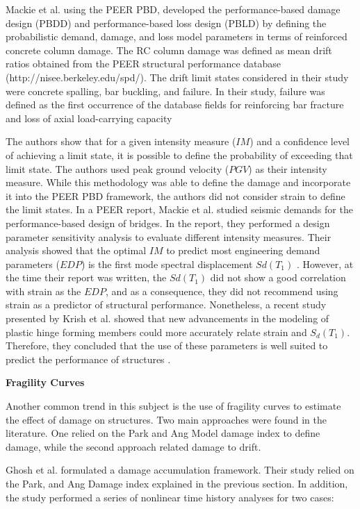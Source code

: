 Mackie et al. \cite{Mackie2007} using the PEER PBD, developed the performance-based damage design (PBDD) and performance-based loss design (PBLD) by defining the probabilistic demand, damage, and loss model parameters in terms of reinforced concrete column damage. The RC column damage was defined as mean drift ratios obtained from the PEER structural performance database (http://nisee.berkeley.edu/spd/). The drift limit states considered in their study were concrete spalling, bar buckling, and failure. In their study, failure was defined as the first occurrence of the database fields for reinforcing bar fracture and loss of axial load-carrying capacity 

The authors show that for a given intensity measure ($IM$) and a confidence level of achieving a limit state, it is possible to define the probability of exceeding that limit state. The authors used peak ground velocity ($PGV$) as their intensity measure. While this methodology was able to define the damage and incorporate it into the PEER PBD framework, the authors did not consider strain to define the limit states. In a PEER report, Mackie et al. studied seismic demands for the performance-based design of bridges. In the report, they performed a design parameter sensitivity analysis to evaluate different intensity measures. Their analysis showed that the optimal $IM$ to predict most engineering demand parameters ($EDP$) is the first mode spectral displacement $Sd(T_{1})$  \cite{Mackie2003}. However, at the time their report was written, the $Sd(T_{1})$ did not show a good correlation with strain as the $EDP$, and as a consequence, they did not recommend using strain as a predictor of structural performance. Nonetheless, a recent study presented by Krish et al. showed that new advancements in the modeling of plastic hinge forming members could more accurately relate strain and $S_{d}(T_{1})$. Therefore, they concluded that the use of these parameters is well suited to predict the performance of structures \cite{Krish2018}.

\textbf{Fragility Curves}

Another common trend in this subject is the use of fragility curves to estimate the effect of damage on structures. Two main approaches were found in the literature. One relied on the Park and Ang Model damage index to define damage, while the second approach related damage to drift.

Ghosh et al. \cite{Ghosh2015} formulated a damage accumulation framework. Their study relied on the Park, and Ang Damage index explained in the previous section. In addition, the study performed a series of nonlinear time history analyses for two cases:

